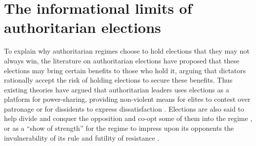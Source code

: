\documentclass[12pt]{article}\usepackage[]{graphicx}\usepackage[]{color}
\newcommand{\1}{\mathbbm{1}}
\begin{document}
%
%


\section{The informational limits of authoritarian elections}
\label{sec:info}
To explain why authoritarian regimes choose to hold elections that they may not always win, the literature on authoritarian elections have proposed that these elections may bring certain benefits to those who hold it, arguing that dictators rationally accept the risk of holding elections to secure these benefits. Thus existing theories have argued that authoritarian leaders uses elections as a platform for power-sharing, providing non-violent means for elites to contest over patronage \citep{LustOkar2006} or for dissidents to express dissatisfaction \citep{AR2005}. Elections are also said to help divide and conquer the opposition and co-opt some of them into the regime \citep{LustOkar2005}, or as a ``show of strength'' for the regime to impress upon its opponents the invulnerability of its rule and futility of resistance \citep{Geddes2005}. 
\end{document}
